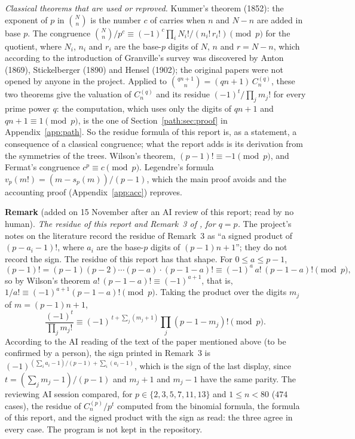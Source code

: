 \documentclass[11pt]{article}
\theoremstyle{definition}
\theoremstyle{remark}
\numberwithin{equation}{section}
\numberwithin{figure}{section}
\begin{document}
\emph{Classical theorems that are used or reproved.} Kummer's theorem (1852): the exponent of $p$ in
$\binom Nn$ is the number $c$ of carries when $n$ and $N-n$ are added in base $p$. The congruence
$\binom Nn/p^c\equiv(-1)^c\prod_iN_i!/(n_i!\,r_i!)\pmod p$ for the quotient, where $N_i$, $n_i$ and $r_i$ are
the base-$p$ digits of $N$, $n$ and $r=N-n$, which according to the introduction
of Granville's survey \cite{Granville} was discovered by Anton (1869), Stickelberger (1890) and Hensel (1902);
the original papers were not opened by anyone in the project. Applied to
$\binom{qn+1}{n}=(qn+1)\,C_n^{(q)}$, these two theorems give the valuation of $C_n^{(q)}$ and its residue
$(-1)^t/\prod_jm_j!$ for every prime power $q$: the computation, which uses only the digits of $qn+1$ and
$qn+1\equiv1\pmod p$, is the one of Section~\ref{path:sec:proof} in Appendix~\ref{app:path}. So the residue
formula of this report is, as a statement, a consequence of a classical congruence; what the report adds is
its derivation from the symmetries of the trees. Wilson's theorem, $(p-1)!\equiv-1\pmod p$, and
Fermat's congruence $c^p\equiv c\pmod p$. Legendre's formula $v_p(m!)=(m-s_p(m))/(p-1)$, which the main proof
avoids and the accounting proof (Appendix~\ref{app:acc}) reproves.

\medskip\noindent\textbf{Remark} (added on 15 November after an AI review of this report; read by no human).
\emph{The residue of this report and Remark~3 of \cite{Konvalinka}, for $q=p$.} The project's notes on the
literature record the residue of Remark~3 as ``a signed product of $(p-a_i-1)!$, where $a_i$ are the base-$p$
digits of $(p-1)n+1$''; they do not record the sign. The residue of this report has that shape. For
$0\le a\le p-1$,
\[
 (p-1)!=(p-1)(p-2)\cdots(p-a)\cdot(p-1-a)!\equiv(-1)^a\,a!\,(p-1-a)!\pmod p ,
\]
so by Wilson's theorem $a!\,(p-1-a)!\equiv(-1)^{a+1}$, that is, $1/a!\equiv(-1)^{a+1}(p-1-a)!\pmod p$. Taking
the product over the digits $m_j$ of $m=(p-1)n+1$,
\[
 \frac{(-1)^t}{\prod_jm_j!}\equiv(-1)^{\,t+\sum_j(m_j+1)}\prod_j(p-1-m_j)!\pmod p .
\]
According to the AI reading of the text of the paper mentioned above (to be confirmed by a person), the sign
printed in Remark~3 is $(-1)^{(\sum_ia_i-1)/(p-1)+\sum_i(a_i-1)}$, which is the sign of the last display, since
$t=(\sum_jm_j-1)/(p-1)$ and $m_j+1$ and $m_j-1$ have the same parity. The reviewing AI session compared, for $p\in\{2,3,5,7,11,13\}$ and $1\le n<80$ ($474$
cases), the residue of $C_n^{(p)}/p^t$ computed from the binomial formula, the formula of this report, and the
signed product with the sign as read: the three agree in every case. The program is not kept in the
repository.
\end{document}
